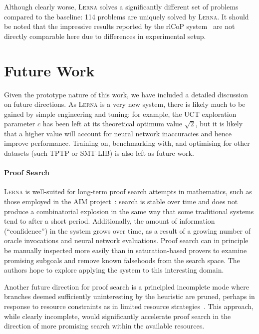 \documentclass{llncs}
\newcommand{\lerna}{\textsc{Lerna}}
\begin{document}
Although clearly worse, \lerna{} solves a significantly different set of problems compared to the baseline: 114 problems are uniquely solved by \lerna{}.
It should be noted that the impressive results reported by the rlCoP system~\cite{rlCoP} are not directly comparable here due to differences in experimental setup.


\section{Future Work}

Given the prototype nature of this work, we have included a detailed discussion on future directions. 
As \lerna{} is a very new system, there is likely much to be gained by simple engineering and tuning: for example, the UCT exploration parameter \(c\) has been left at its theoretical optimum value \(\sqrt{2}\), but it is likely that a higher value will account for neural network inaccuracies and hence improve performance.
Training on, benchmarking with, and optimising for other datasets (such TPTP or SMT-LIB) is also left as future work.

\paragraph{Proof Search}
\lerna{} is well-suited for long-term proof search attempts in mathematics, such as those employed in the AIM project~\cite{AIM}: search is stable over time and does not produce a combinatorial explosion in the same way that some traditional systems tend to after a short period.
Additionally, the amount of information (``confidence'') in the system grows over time, as a result of a growing number of oracle invocations and neural network evaluations.
Proof search can in principle be manually inspected more easily than in saturation-based provers to examine promising subgoals and remove known falsehoods from the search space.
The authors hope to explore applying the system to this interesting domain. 

Another future direction for proof search is a principled incomplete mode where branches deemed sufficiently uninteresting by the heuristic are pruned, perhaps in response to resource constraints as in limited resource strategies~\cite{LRS}.
This approach, while clearly incomplete, would significantly accelerate proof search in the direction of more promising search within the available resources.
\end{document}
